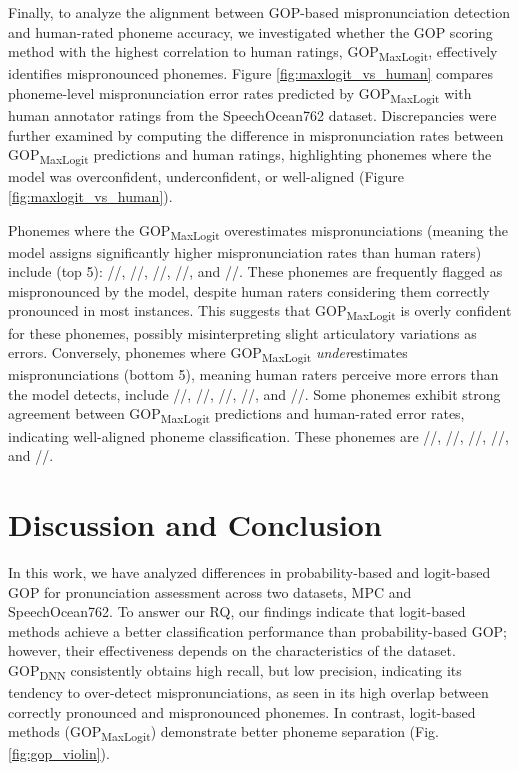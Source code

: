 \documentclass{Interspeech}
\begin{document}
Finally, to analyze the alignment between GOP-based mispronunciation detection and human-rated phoneme accuracy, we investigated whether the GOP scoring method with the highest correlation to human ratings, GOP\textsubscript{MaxLogit}, effectively identifies mispronounced phonemes. Figure \ref{fig:maxlogit_vs_human} compares phoneme-level mispronunciation error rates predicted by GOP\textsubscript{MaxLogit} with human annotator ratings from the SpeechOcean762 dataset. Discrepancies were further examined by computing the difference in mispronunciation rates between GOP\textsubscript{MaxLogit} predictions and human ratings, highlighting phonemes where the model was overconfident, underconfident, or well-aligned (Figure \ref{fig:maxlogit_vs_human}). 
%

Phonemes where the GOP\textsubscript{MaxLogit} overestimates mispronunciations (meaning the model assigns significantly higher mispronunciation rates than human raters) include (top 5): //, //, //, //, and //. These phonemes are frequently flagged as mispronounced by the model, despite human raters considering them correctly pronounced in most instances. This suggests that GOP\textsubscript{MaxLogit} is overly confident for these phonemes, possibly misinterpreting slight articulatory variations as errors. Conversely, phonemes where GOP\textsubscript{MaxLogit} \textit{under}estimates mispronunciations (bottom 5), meaning human raters perceive more errors than the model detects, include /\textipa{\ae}/, //, //, //, and //. Some phonemes exhibit strong agreement between GOP\textsubscript{MaxLogit} predictions and human-rated error rates, indicating well-aligned phoneme classification. These phonemes are //, //, //, //, and //.





\section{Discussion and Conclusion}

In this work, we have analyzed differences in probability-based and logit-based GOP for pronunciation assessment across two datasets, MPC and SpeechOcean762. To answer our RQ, %
our findings indicate that logit-based methods achieve a better classification performance than probability-based GOP; however, their effectiveness depends on the characteristics of the dataset.
%
GOP\textsubscript{DNN} consistently obtains high recall, but low precision, indicating its tendency to over-detect mispronunciations, as seen in its high overlap between correctly pronounced and mispronounced phonemes. In contrast, logit-based methods (GOP\textsubscript{MaxLogit}) demonstrate better phoneme separation (Fig. \ref{fig:gop_violin}).
\end{document}
